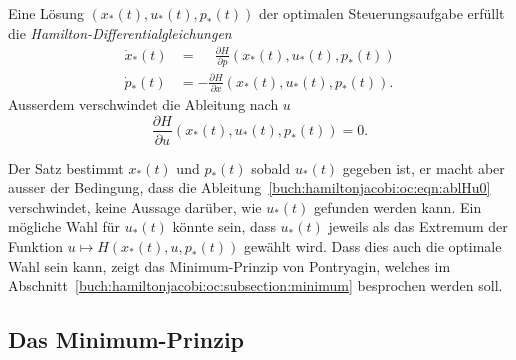 \begin{satz}
Eine Lösung $(x_*(t),u_*(t),p_*(t))$ der optimalen Steuerungsaufgabe
erfüllt die {\em Hamilton-Differentialgleichungen}
\begin{align*}
\dot{x}_*(t)
&=
\phantom{-}
\frac{\partial H}{\partial p}(x_*(t),u_*(t),p_*(t))
\\
\dot{p}_*(t)
&=
-
\frac{\partial H}{\partial x}(x_*(t),u_*(t),p_*(t)).
\end{align*}
Ausserdem verschwindet die Ableitung nach $u$
\begin{equation}
\frac{\partial H}{\partial u}(x_*(t),u_*(t),p_*(t))=0.
\label{buch:hamiltonjacobi:oc:eqn:ablHu0}
\end{equation}
\end{satz}

Der Satz bestimmt $x_*(t)$ und $p_*(t)$ sobald $u_*(t)$ gegeben ist,
er macht aber ausser der Bedingung, dass die
Ableitung~\eqref{buch:hamiltonjacobi:oc:eqn:ablHu0} verschwindet,
keine Aussage darüber, wie $u_*(t)$ gefunden werden kann.
Ein mögliche Wahl für $u_*(t)$ könnte sein, dass $u_*(t)$ jeweils
als das Extremum der Funktion $u\mapsto H(x_*(t),u,p_*(t))$
gewählt wird.
Dass dies auch die optimale Wahl sein kann, zeigt das Minimum-Prinzip
von Pontryagin, welches im
Abschnitt~\ref{buch:hamiltonjacobi:oc:subsection:minimum}
besprochen werden soll.

%
%
\subsection{Das Minimum-Prinzip
\label{buch:hamiltonjacobi:oc:subsection:minimum}}



